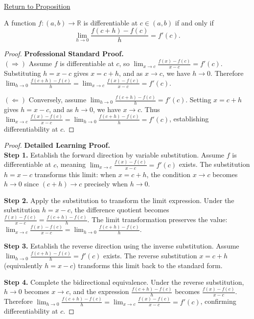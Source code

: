\newpage
{}
\label{prf:increment-definition-derivative}

\begin{remark*}[Return]
\hyperref[prop:derivative-h-form-equivalence]{Return to Proposition}
\end{remark*}

\begin{theorem*}
A function $f: (a,b) \to \mathbb{R}$ is differentiable at $c \in (a,b)$ if and only if 
\[ \lim_{h \to 0} \frac{f(c+h) - f(c)}{h} = f'(c). \]
\end{theorem*}

\begin{proof}
\textbf{Professional Standard Proof.}~\\
$(\Rightarrow)$ Assume $f$ is differentiable at $c$, so $\lim_{x \to c} \frac{f(x) - f(c)}{x - c} = f'(c)$. Substituting $h = x - c$ gives $x = c + h$, and as $x \to c$, we have $h \to 0$. Therefore $\lim_{h \to 0} \frac{f(c+h) - f(c)}{h} = \lim_{x \to c} \frac{f(x) - f(c)}{x - c} = f'(c)$.

$(\Leftarrow)$ Conversely, assume $\lim_{h \to 0} \frac{f(c+h) - f(c)}{h} = f'(c)$. Setting $x = c + h$ gives $h = x - c$, and as $h \to 0$, we have $x \to c$. Thus $\lim_{x \to c} \frac{f(x) - f(c)}{x - c} = \lim_{h \to 0} \frac{f(c+h) - f(c)}{h} = f'(c)$, establishing differentiability at $c$.
\end{proof}

\begin{proof}
\textbf{Detailed Learning Proof.}~\\

\textbf{Step 1.} Establish the forward direction by variable substitution. Assume $f$ is differentiable at $c$, meaning $\lim_{x \to c} \frac{f(x) - f(c)}{x - c} = f'(c)$ exists. The substitution $h = x - c$ transforms this limit: when $x = c + h$, the condition $x \to c$ becomes $h \to 0$ since $(c + h) \to c$ precisely when $h \to 0$.

\textbf{Step 2.} Apply the substitution to transform the limit expression. Under the substitution $h = x - c$, the difference quotient becomes $\frac{f(x) - f(c)}{x - c} = \frac{f(c + h) - f(c)}{h}$. The limit transformation preserves the value: $\lim_{x \to c} \frac{f(x) - f(c)}{x - c} = \lim_{h \to 0} \frac{f(c + h) - f(c)}{h}$.

\textbf{Step 3.} Establish the reverse direction using the inverse substitution. Assume $\lim_{h \to 0} \frac{f(c+h) - f(c)}{h} = f'(c)$ exists. The reverse substitution $x = c + h$ (equivalently $h = x - c$) transforms this limit back to the standard form.

\textbf{Step 4.} Complete the bidirectional equivalence. Under the reverse substitution, $h \to 0$ becomes $x \to c$, and the expression $\frac{f(c+h) - f(c)}{h}$ becomes $\frac{f(x) - f(c)}{x - c}$. Therefore $\lim_{h \to 0} \frac{f(c+h) - f(c)}{h} = \lim_{x \to c} \frac{f(x) - f(c)}{x - c} = f'(c)$, confirming differentiability at $c$.
\end{proof}

